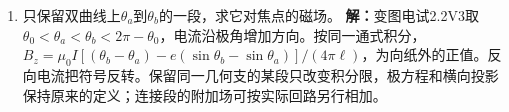 \documentclass[UTF8,fontset=fandol,a4paper,11pt]{ctexart}
\begin{document}
\begin{enumerate}
\item 只保留双曲线上$\theta_a$到$\theta_b$的一段，求它对焦点的磁场。
\textbf{解：}变图电试2.2V3取$\theta_0<\theta_a<\theta_b<2\pi-\theta_0$，电流沿极角增加方向。按同一通式积分，$B_z=\mu_0I[(\theta_b-\theta_a)-e(\sin\theta_b-\sin\theta_a)]/(4\pi\ell)$，为向纸外的正值。反向电流把符号反转。保留同一几何支的某段只改变积分限，极方程和横向投影保持原来的定义；连接段的附加场可按实际回路另行相加。
\begin{center}\begin{minipage}{.98\linewidth}\centering
{}
\end{minipage}
\end{center}
\end{enumerate}
\end{document}

